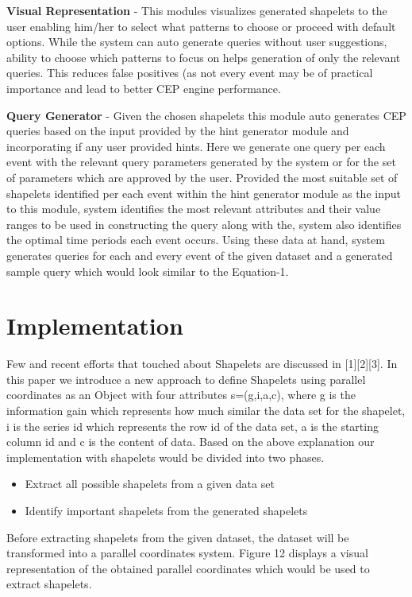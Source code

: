 \documentclass[letterpaper, 10 pt, conference]{IEEEtran}  %
\begin{document}
\textbf{Visual Representation} - This modules visualizes generated shapelets to the user enabling him/her to select what patterns to choose or proceed with default options. While the system can auto generate queries without user suggestions, ability to choose which patterns to focus on helps generation of only the relevant queries. This reduces false positives (as not every event may be of practical importance and lead to better CEP engine performance.

\textbf{Query Generator} - Given the chosen shapelets this module auto generates CEP queries based on the input provided by the hint generator module and incorporating if any user provided hints. Here we generate one query per each event with the relevant query parameters generated by the system or for the set of parameters which are approved by the user. Provided the most suitable set of shapelets identified per each event within the hint generator module as the input to this module, system identifies the most relevant attributes and their value ranges to be used in constructing the query along with the, system also identifies the optimal time periods each event occurs. Using these data at hand, system generates queries for each and every event of the given dataset and a generated sample query which would look similar to the Equation-1.

\section{Implementation}
Few and recent efforts that touched about Shapelets are discussed in [1][2][3]. In this paper we introduce a new approach to define Shapelets using parallel coordinates as an Object with four attributes s=(g,i,a,c), where g is the information gain which represents how much similar the data set for the shapelet, i is the series id which represents the row id of the data set, a is the starting column id and c is the content of data. Based on the above explanation our implementation with shapelets would be divided into two phases.

\begin{itemize}
\item Extract all possible shapelets from a given data set
\item Identify important shapelets from the generated shapelets
\end{itemize}

Before extracting shapelets from the given dataset, the dataset will be transformed into a parallel coordinates system. Figure 12 displays a visual representation of the obtained parallel coordinates which would be used to extract shapelets.
\end{document}

